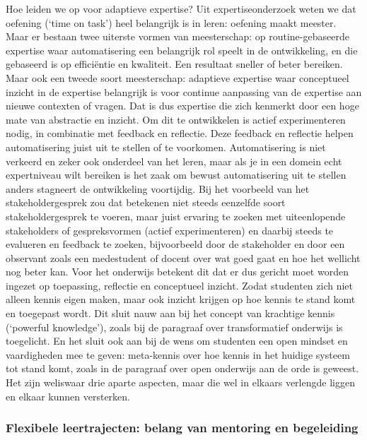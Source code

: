 \documentclass{jote-book}
\begin{document}
	Hoe leiden we op voor adaptieve expertise? Uit expertiseonderzoek weten we dat oefening (‘time on task') heel belangrijk is in leren: oefening maakt meester. Maar er bestaan twee uiterste vormen van meesterschap: op routine-gebaseerde expertise waar automatisering een belangrijk rol speelt in de ontwikkeling, en die gebaseerd is op efficiëntie en kwaliteit. Een resultaat sneller of beter bereiken. Maar ook een tweede soort meesterschap: adaptieve expertise waar conceptueel inzicht in de expertise belangrijk is voor continue aanpassing van de expertise aan nieuwe contexten of vragen. Dat is dus expertise die zich kenmerkt door een hoge mate van abstractie en inzicht. Om dit te ontwikkelen is actief experimenteren nodig, in combinatie met feedback en reflectie. Deze feedback en reflectie helpen automatisering juist uit te stellen of te voorkomen. Automatisering is niet verkeerd en zeker ook onderdeel van het leren, maar als je in een domein echt expertniveau wilt bereiken is het zaak om bewust automatisering uit te stellen anders stagneert de ontwikkeling voortijdig. Bij het voorbeeld van het stakeholdergesprek zou dat betekenen niet steeds eenzelfde soort stakeholdergesprek te voeren, maar juist ervaring te zoeken met uiteenlopende stakeholders of gespreksvormen (actief experimenteren) en daarbij steeds te evalueren en feedback te zoeken, bijvoorbeeld door de stakeholder en door een observant zoals een medestudent of docent over wat goed gaat en hoe het wellicht nog beter kan. Voor het onderwijs betekent dit dat er dus gericht moet worden ingezet op toepassing, reflectie en conceptueel inzicht. Zodat studenten zich niet alleen kennis eigen maken, maar ook inzicht krijgen op hoe kennis te stand komt en toegepast wordt. Dit sluit nauw aan bij het concept van krachtige kennis (‘powerful knowledge'), zoals bij de paragraaf over transformatief onderwijs is toegelicht. En het sluit ook aan bij de wens om studenten een open mindset en vaardigheden mee te geven: meta-kennis over hoe kennis in het huidige systeem tot stand komt, zoals in de paragraaf over open onderwijs aan de orde is geweest. Het zijn weliswaar drie aparte aspecten, maar die wel in elkaars verlengde liggen en elkaar kunnen versterken.



	\subsubsection{Flexibele leertrajecten: belang van mentoring en begeleiding}
\end{document}
